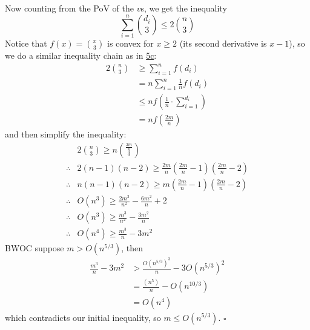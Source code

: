 \documentclass[12pt]{article}
\begin{document}
\begin{enumerate}
        Now counting from the PoV of the $v$s, we get the inequality
        \[\sum_{i=1}^{n} \binom{d_i}{3} \le 2\binom{n}{3}\]
        Notice that $f(x)=\binom{x}{3}$ is convex for $x \ge 2$
        (its second derivative is $x-1$), so we do a similar inequality chain as in \hyperref[prob:5c]{5c}:
        \begin{align*}
            2\binom{n}{3}
             & \ge \sum_{i=1}^{n} f(d_i)                              \\
             & = n \sum_{i=1}^{n} \frac{1}{n} f(d_i)                  \\
             & \le n f\left(\frac{1}{n} \cdot \sum_{i=1}^{d_i}\right) \\
             & = n f\left(\frac{2m}{n}\right)
        \end{align*}
        and then simplify the inequality:
        \begin{align*}
                         & 2\binom{n}{3} \ge n\binom{\frac{2m}{n}}{3}                                         \\
            \therefore{} & 2(n-1)(n-2) \ge \frac{2m}{n}\left(\frac{2m}{n}-1\right)\left(\frac{2m}{n}-2\right) \\
            \therefore{} & n(n-1)(n-2) \ge m\left(\frac{2m}{n}-1\right)\left(\frac{2m}{n}-2\right)            \\
            \therefore{} & O\left(n^3\right) \ge \frac{2m^3}{n^2} - \frac{6m^2}{n} + 2                        \\
            \therefore{} & O\left(n^3\right) \ge \frac{m^3}{n^2}-\frac{3m^2}{n}                               \\
            \therefore{} & O\left(n^4\right) \ge \frac{m^3}{n}-3m^2
        \end{align*}
        BWOC suppose $m > O\left(n^{5/3}\right)$, then
        \begin{align*}
            \frac{m^3}{n}-3m^2
             & > \frac{O\left(n^{5/3}\right)^3}{n}-3O\left(n^{5/3}\right)^2 \\
             & = \frac{\left(n^5\right)}{n}-O\left(n^{10/3}\right)          \\
             & = O\left(n^4\right)
        \end{align*}
        which contradicts our initial inequality, so $m \le O\left(n^{5/3}\right)$. $\square$
\end{enumerate}
\end{document}
